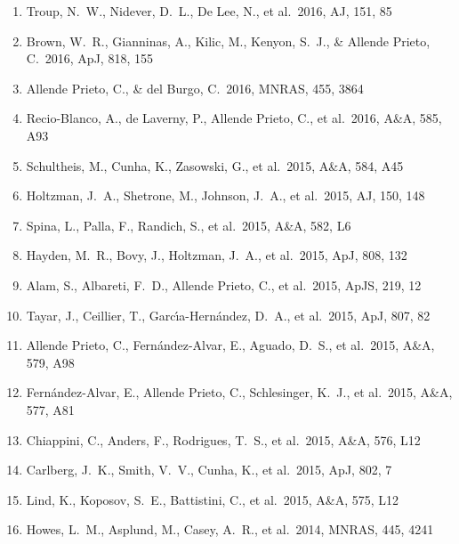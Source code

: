 \documentclass[12pt]{article}
\begin{document}
\begin{enumerate}
\item Troup, N.~W., Nidever, D.~L., De Lee, N., et al.\ 2016, AJ, 151, 85 


\item Brown, W.~R., Gianninas, A., Kilic, M., Kenyon, S.~J., \& Allende Prieto, C.\ 2016, ApJ, 818, 155 


\item Allende Prieto, C., \& del Burgo, C.\ 2016, MNRAS, 455, 3864 


\item Recio-Blanco, A., de Laverny, P., Allende Prieto, C., et al.\ 2016, A\&A, 585, A93 


\item Schultheis, M., Cunha, K., Zasowski, G., et al.\ 2015, A\&A, 584, A45 


\item Holtzman, J.~A., 
Shetrone, M., Johnson, J.~A., et al.\ 2015, AJ, 150, 148 


\item Spina, L., Palla, F., Randich, S., et al.\ 2015, A\&A, 582, L6 


\item Hayden, M.~R., Bovy, J., 
Holtzman, J.~A., et al.\ 2015, ApJ, 808, 132 


\item Alam, S., Albareti, F.~D., 
Allende Prieto, C., et al.\ 2015, ApJS, 219, 12 


\item Tayar, J., Ceillier, T., 
Garc{\'{\i}}a-Hern{\'a}ndez, D.~A., et al.\ 2015, ApJ, 807, 82 


\item Allende Prieto, C., Fern{\'a}ndez-Alvar, E., Aguado, D.~S., et al.\ 2015, A\&A, 579, A98 


\item  Fern{\'a}ndez-Alvar, E., Allende Prieto, C., Schlesinger, K.~J., et al.\ 2015, A\&A, 577, A81 


\item Chiappini, C., Anders, F., Rodrigues, T.~S., et al.\ 2015, A\&A, 576, L12 


\item Carlberg, J.~K., Smith, V.~V., Cunha, K., et al.\ 2015, ApJ, 802, 7 


\item Lind, K., Koposov, S.~E., Battistini, C., et al.\ 2015, A\&A, 575, L12 


\item Howes, L.~M., Asplund, 
M., Casey, A.~R., et al.\ 2014, MNRAS, 445, 4241 



\end{enumerate}
\end{document}
